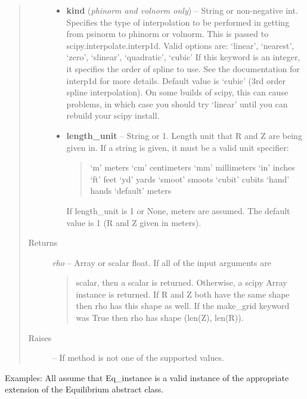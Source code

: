 \documentclass[letterpaper,10pt,english]{sphinxmanual}
\begin{document}
\begin{fulllineitems}
\begin{fulllineitems}
\begin{quote}
\begin{description}
\begin{itemize}
\item {} 
\textbf{kind} (\emph{phinorm and volnorm only}) --
String or non-negative int.
Specifies the type of interpolation to be performed in getting
from psinorm to phinorm or volnorm. This is passed to
scipy.interpolate.interp1d. Valid options are:
`linear', `nearest', `zero', `slinear', `quadratic', `cubic'
If this keyword is an integer, it specifies the order of spline
to use. See the documentation for interp1d for more details.
Default value is `cubic' (3rd order spline interpolation). On
some builds of scipy, this can cause problems, in which case
you should try `linear' until you can rebuild your scipy install.

\item {} 
\textbf{length\_unit} --
String or 1. Length unit that R and Z are being given
in. If a string is given, it must be a valid unit specifier:
\begin{quote}

`m'         meters
`cm'        centimeters
`mm'        millimeters
`in'        inches
`ft'        feet
`yd'        yards
`smoot'     smoots
`cubit'     cubits
`hand'      hands
`default'   meters
\end{quote}

If length\_unit is 1 or None, meters are assumed. The default
value is 1 (R and Z given in meters).

\end{itemize}

\item[{Returns}] \leavevmode

\emph{rho} --
Array or scalar float. If all of the input arguments are
\begin{quote}

scalar, then a scalar is returned. Otherwise, a scipy Array
instance is returned. If R and Z both have the same shape then
rho has this shape as well. If the make\_grid keyword was True
then rho has shape (len(Z), len(R)).
\end{quote}


\item[{Raises }] \leavevmode
{} -- 
If method is not one of the supported values.

\end{description}\end{quote}

Examples:
All assume that Eq\_instance is a valid instance of the appropriate
extension of the Equilibrium abstract class.


\end{fulllineitems}
\end{fulllineitems}
\end{document}
